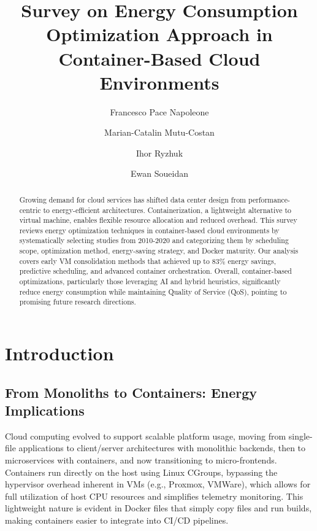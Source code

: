 \documentclass[runningheads]{llncs}
\begin{document}
\title{Survey on Energy Consumption Optimization Approach in Container-Based Cloud Environments}


\author{Francesco Pace Napoleone \and
Marian-Catalin Mutu-Costan \and
Ihor Ryzhuk \and
Ewan Soueidan}



\maketitle
%
\begin{abstract}

Growing demand for cloud services has shifted data center design from performance-centric to energy-efficient architectures. Containerization, a lightweight alternative to virtual machine, enables flexible resource allocation and reduced overhead. This survey reviews energy optimization techniques in container-based cloud environments by systematically selecting studies from 2010-2020 and categorizing them by scheduling scope, optimization method, energy-saving strategy, and Docker maturity. Our analysis covers early VM consolidation methods that achieved up to 83\% energy savings, predictive scheduling, and advanced container orchestration. Overall, container-based optimizations, particularly those leveraging AI and hybrid heuristics, significantly reduce energy consumption while maintaining Quality of Service (QoS), pointing to promising future research directions.

\end{abstract}

\section{Introduction}
\subsection{From Monoliths to Containers: Energy Implications}
Cloud computing evolved to support scalable platform usage, moving from single-file applications to client/server 
architectures with monolithic backends, then to microservices with containers, and now transitioning to micro-frontends. 
Containers run directly on the host using Linux CGroups, bypassing the hypervisor overhead inherent in VMs (e.g., 
Proxmox, VMWare), which allows for full utilization of host CPU resources and simplifies telemetry monitoring. 
This lightweight nature is evident in Docker files that simply copy files and run builds, making containers easier to integrate 
into CI/CD pipelines.
\end{document}
